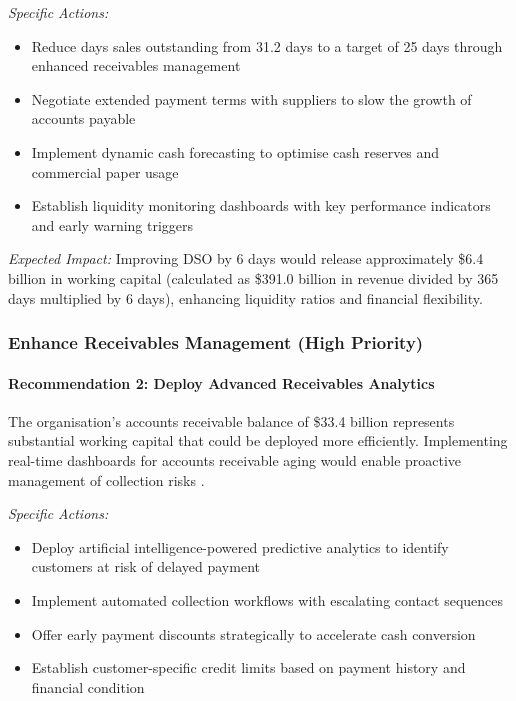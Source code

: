\documentclass[12pt,a4paper]{article}
\begin{document}
\textit{Specific Actions:}
\begin{itemize}
\item Reduce days sales outstanding from 31.2 days to a target of 25 days through enhanced receivables management
\item Negotiate extended payment terms with suppliers to slow the growth of accounts payable
\item Implement dynamic cash forecasting to optimise cash reserves and commercial paper usage
\item Establish liquidity monitoring dashboards with key performance indicators and early warning triggers
\end{itemize}

\textit{Expected Impact:} Improving DSO by 6 days would release approximately \$6.4 billion in working capital (calculated as \$391.0 billion in revenue divided by 365 days multiplied by 6 days), enhancing liquidity ratios and financial flexibility.

\subsubsection{Enhance Receivables Management (High Priority)}

\paragraph{Recommendation 2: Deploy Advanced Receivables Analytics}

The organisation's accounts receivable balance of \$33.4 billion represents substantial working capital that could be deployed more efficiently. Implementing real-time dashboards for accounts receivable aging would enable proactive management of collection risks \citep{apple202410k}.

\textit{Specific Actions:}
\begin{itemize}
\item Deploy artificial intelligence-powered predictive analytics to identify customers at risk of delayed payment
\item Implement automated collection workflows with escalating contact sequences
\item Offer early payment discounts strategically to accelerate cash conversion
\item Establish customer-specific credit limits based on payment history and financial condition
\end{itemize}
\end{document}
